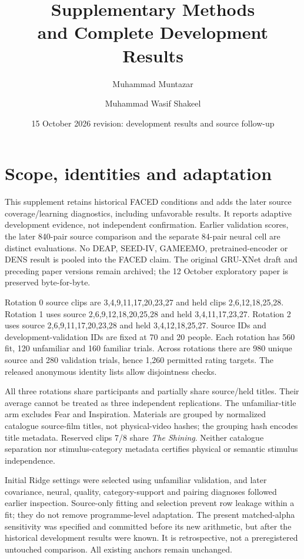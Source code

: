 \documentclass[10pt,a4paper]{article}
\title{Supplementary Methods\\and Complete Development Results}
\author{Muhammad Muntazar \and Muhammad Wasif Shakeel}
\date{15 October 2026 revision: development results and source follow-up}
\begin{document}
\maketitle

\section{Scope, identities and adaptation}
This supplement retains historical FACED conditions and adds the later source coverage/learning diagnostics, including unfavorable results. It reports adaptive development evidence, not independent confirmation. Earlier validation scores, the later 840-pair source comparison and the separate 84-pair neural cell are distinct evaluations. No DEAP, SEED-IV, GAMEEMO, pretrained-encoder or DENS result is pooled into the FACED claim. The original GRU-XNet draft and preceding paper versions remain archived; the 12 October exploratory paper is preserved byte-for-byte.

Rotation 0 source clips are 3,4,9,11,17,20,23,27 and held clips 2,6,12,18,25,28. Rotation 1 uses source 2,6,9,12,18,20,25,28 and held 3,4,11,17,23,27. Rotation 2 uses source 2,6,9,11,17,20,23,28 and held 3,4,12,18,25,27. Source IDs and development-validation IDs are fixed at 70 and 20 people. Each rotation has 560 fit, 120 unfamiliar and 160 familiar trials. Across rotations there are 980 unique source and 280 validation trials, hence 1,260 permitted rating targets. The released anonymous identity lists allow disjointness checks.

All three rotations share participants and partially share source/held titles. Their average cannot be treated as three independent replications. The unfamiliar-title arm excludes Fear and Inspiration. Materials are grouped by normalized catalogue source-film titles, not physical-video hashes; the grouping hash encodes title metadata. Reserved clips 7/8 share \emph{The Shining}. Neither catalogue separation nor stimulus-category metadata certifies physical or semantic stimulus independence.

Initial Ridge settings were selected using unfamiliar validation, and later covariance, neural, quality, category-support and pairing diagnoses followed earlier inspection. Source-only fitting and selection prevent row leakage within a fit; they do not remove programme-level adaptation. The present matched-alpha sensitivity was specified and committed before its new arithmetic, but after the historical development results were known. It is retrospective, not a preregistered untouched comparison. All existing anchors remain unchanged.
\end{document}

